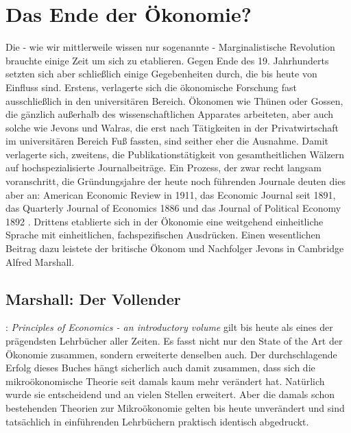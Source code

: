 %
%
%

\chapter{Das Ende der Ökonomie?}
\label{Neoklassik}

Die - wie wir mittlerweile wissen nur sogenannte - Marginalistische Revolution brauchte einige Zeit um sich zu etablieren. Gegen Ende des 19. Jahrhunderts setzten sich aber schließlich einige Gegebenheiten durch, die bis heute von Einfluss sind. Erstens, verlagerte sich die ökonomische Forschung fast ausschließlich in den universitären Bereich. Ökonomen wie Thünen oder Gossen, die gänzlich außerhalb des wissenschaftlichen Apparates arbeiteten, aber auch solche wie Jevons und Walras, die erst nach Tätigkeiten in der Privatwirtschaft im universitären Bereich Fuß fassten, sind seither eher die Ausnahme. Damit verlagerte sich, zweitens, die Publikationstätigkeit von gesamtheitlichen Wälzern auf hochspezialisierte Journalbeiträge. Ein Prozess, der zwar recht langsam voranschritt, die Gründungsjahre der heute noch führenden Journale deuten dies aber an: American Economic Review in 1911, das Economic Journal seit 1891, das Quarterly Journal of Economics 1886 und das Journal of Political Economy 1892 \parencite[S. 340]{Rosner2012}.
Drittens etablierte sich in der Ökonomie eine weitgehend einheitliche Sprache mit einheitlichen, fachspezifischen Ausdrücken. Einen wesentlichen Beitrag dazu leistete der britische Ökonom und Nachfolger Jevons in Cambridge Alfred Marshall.

\section{Marshall: Der Vollender}

\textcite{Marshall1890}: \textit{Principles of Economics - an introductory volume} gilt bis heute als eines der prägendsten Lehrbücher aller Zeiten. Es fasst nicht nur den State of the Art der Ökonomie zusammen, sondern erweiterte denselben auch. Der durchschlagende Erfolg dieses Buches hängt sicherlich auch damit zusammen, dass sich die mikroökonomische Theorie seit damals kaum mehr verändert hat. Natürlich wurde sie entscheidend und an vielen Stellen erweitert. Aber die damals schon bestehenden Theorien zur Mikroökonomie gelten bis heute unverändert und sind tatsächlich in einführenden Lehrbüchern praktisch identisch abgedruckt.

